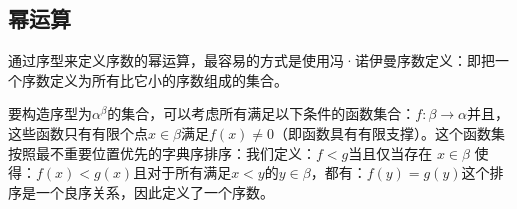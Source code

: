 \subsection{幂运算}
通过序型来定义序数的幂运算，最容易的方式是使用冯·诺伊曼序数定义：即把一个序数定义为所有比它小的序数组成的集合。

要构造序型为\(\alpha^\beta\)的集合，可以考虑所有满足以下条件的函数集合：\(f :\beta\to\alpha\)并且，这些函数只有有限个点\(x\in\beta\)满足\(f(x)\neq0\)（即函数具有有限支撑）。这个函数集按照最不重要位置优先的字典序排序：我们定义：\(f<g\)当且仅当存在 \(x \in \beta\) 使得：\(f(x)<g(x)\)且对于所有满足\(x < y\)的\(y\in\beta\)，都有：\(f(y) = g(y)\)这个排序是一个良序关系，因此定义了一个序数。